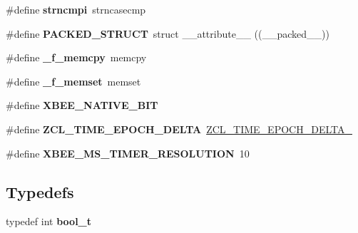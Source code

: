 \begin{DoxyCompactItemize}
\item 
\hypertarget{group__hal__posix_gad3a1fdce8f91caabe3b9aaa93cb69044}{\#define {\bfseries strncmpi}~strncasecmp}\label{group__hal__posix_gad3a1fdce8f91caabe3b9aaa93cb69044}

\item 
\hypertarget{group__hal__posix_gafa9179779c676eed926a35c4ab5fe5b5}{\#define {\bfseries P\-A\-C\-K\-E\-D\-\_\-\-S\-T\-R\-U\-C\-T}~struct \-\_\-\-\_\-attribute\-\_\-\-\_\- ((\-\_\-\-\_\-packed\-\_\-\-\_\-))}\label{group__hal__posix_gafa9179779c676eed926a35c4ab5fe5b5}

\item 
\hypertarget{group__hal__posix_ga3ee5b5bde5321e97420753cf13ce9c1b}{\#define {\bfseries \-\_\-f\-\_\-memcpy}~memcpy}\label{group__hal__posix_ga3ee5b5bde5321e97420753cf13ce9c1b}

\item 
\hypertarget{group__hal__posix_ga210604a4d70c1421599afca049c8dc55}{\#define {\bfseries \-\_\-f\-\_\-memset}~memset}\label{group__hal__posix_ga210604a4d70c1421599afca049c8dc55}

\item 
\hypertarget{group__hal__posix_ga422c69254f74ee55358b35d9eba96602}{\#define {\bfseries X\-B\-E\-E\-\_\-\-N\-A\-T\-I\-V\-E\-\_\-B\-I\-T}}\label{group__hal__posix_ga422c69254f74ee55358b35d9eba96602}

\item 
\hypertarget{group__hal__posix_ga503caf44f78cc52dc196c413cd6c78ab}{\#define {\bfseries Z\-C\-L\-\_\-\-T\-I\-M\-E\-\_\-\-E\-P\-O\-C\-H\-\_\-\-D\-E\-L\-T\-A}~\hyperlink{group__hal_ga735b0974380a73e9d7a12a1f199a5921}{Z\-C\-L\-\_\-\-T\-I\-M\-E\-\_\-\-E\-P\-O\-C\-H\-\_\-\-D\-E\-L\-T\-A\-\_}}\label{group__hal__posix_ga503caf44f78cc52dc196c413cd6c78ab}

\item 
\hypertarget{group__hal__posix_ga5cbeea4d9344138b657f78ad38813584}{\#define {\bfseries X\-B\-E\-E\-\_\-\-M\-S\-\_\-\-T\-I\-M\-E\-R\-\_\-\-R\-E\-S\-O\-L\-U\-T\-I\-O\-N}~10}\label{group__hal__posix_ga5cbeea4d9344138b657f78ad38813584}

\end{DoxyCompactItemize}
\subsection*{Typedefs}
\begin{DoxyCompactItemize}
\item 
\hypertarget{group__hal__posix_ga812d16e5494522586b3784e55d479912}{typedef int {\bfseries bool\-\_\-t}}\label{group__hal__posix_ga812d16e5494522586b3784e55d479912}

\end{DoxyCompactItemize}
